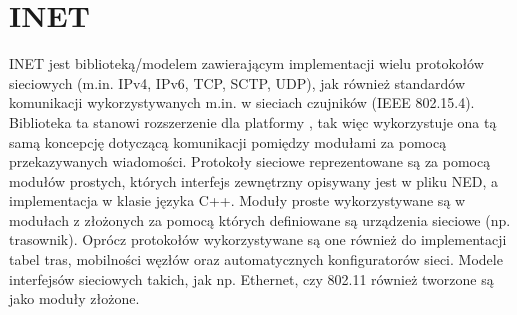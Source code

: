 \section{INET}
INET jest biblioteką/modelem zawierającym implementacji wielu protokołów sieciowych (m.in. IPv4, IPv6, TCP, SCTP, UDP), jak również standardów komunikacji wykorzystywanych m.in. w sieciach czujników (IEEE 802.15.4)\cite{inet}. Biblioteka ta stanowi rozszerzenie dla platformy \omnetpp, tak więc wykorzystuje ona tą samą koncepcję dotyczącą komunikacji pomiędzy modułami za pomocą przekazywanych wiadomości. Protokoły sieciowe reprezentowane są za pomocą modułów prostych, których interfejs zewnętrzny opisywany jest w pliku NED, a implementacja w klasie języka C++. Moduły proste wykorzystywane są w modułach z złożonych za pomocą których definiowane są urządzenia sieciowe (np. trasownik). Oprócz protokołów wykorzystywane są one również do implementacji tabel tras, mobilności węzłów oraz automatycznych konfiguratorów sieci. Modele interfejsów sieciowych takich, jak np. Ethernet, czy 802.11 również tworzone są jako moduły złożone. 
